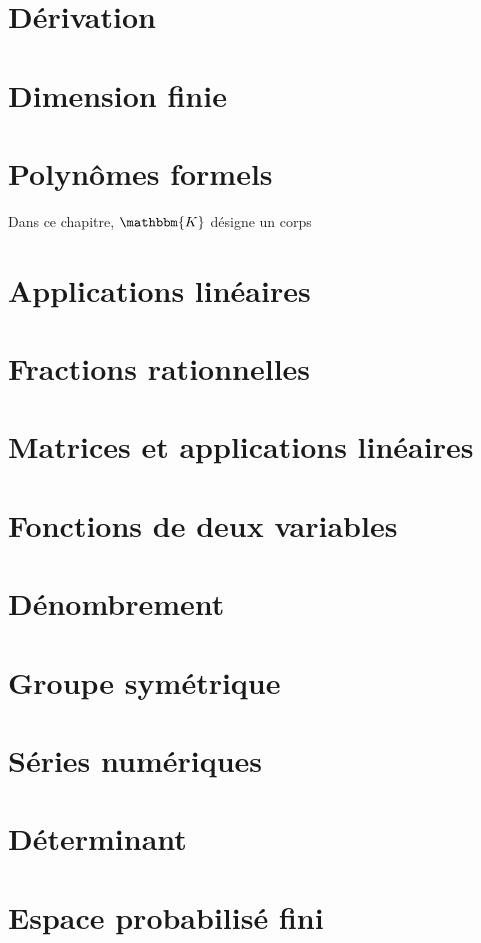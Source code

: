 \documentclass[a4paper,oneside]{book}
\newcommand{\chap}[2][0]{
	\setcounter{chapter}{#1 - 1}
	\chapter{#2}
	\renewcommand*\parttitle{#2}
}
\begin{document}
	{
		\chap[16]{Dérivation}
		\renewcommand{\cwd}{../chap16}
		
		
		
		
	}

	{
		\chap[17]{Dimension finie}
		\renewcommand{\cwd}{../chap17}
		
	}

	{
		\chap[18]{Polynômes formels}
		\renewcommand{\cwd}{../chap18}
		Dans ce chapitre, $\mathbbm{K}$ désigne un corps
		
		
		
		
	}

	{
		\chap[19]{Applications linéaires}
		\renewcommand{\cwd}{../chap19}
		
		
		
		
		
	}

	{
		\chap[20]{Fractions rationnelles}
		\renewcommand{\cwd}{../chap20}
		
		
	}

	{
		\chap[21]{Matrices et applications linéaires}
		\renewcommand{\cwd}{../chap21}
		
		
		
		
		
		
	}

	{
		\chap[22]{Fonctions de deux variables}
		\renewcommand{\cwd}{../chap22}
		
		
		
	}

	{
		\chap[23]{Dénombrement}
		\renewcommand{\cwd}{../chap23}
		
		
		
		\addrecap
	}

	{
		\chap[24]{Groupe symétrique}
		\renewcommand{\cwd}{../chap24}
		
		
		
		
		\addrecap
	}

	{
		\chap[25]{Séries numériques}
		\renewcommand{\cwd}{../chap25}
		
		
		
		
		
		
		
		
	}

	{
		\chap[26]{Déterminant}
		\renewcommand{\cwd}{../chap26}
		
		
		
		
		
	}

	{
		\chap[27]{Espace probabilisé fini}
		\renewcommand{\cwd}{../chap27}
		\let\overlin\overline
		\let\overline\bar
		
		
		
		\addrecap
	}
\end{document}
